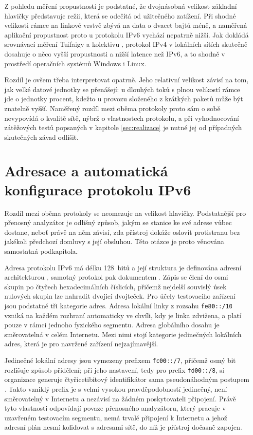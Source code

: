 Z pohledu měření propustnosti je podstatné, že dvojnásobná velikost základní hlavičky představuje režii, která se odečítá od užitečného zatížení. Při shodné velikosti rámce na linkové vrstvě zbývá na data o dvacet bajtů méně, a naměřená aplikační propustnost proto u protokolu IPv6 vychází nepatrně nižší. Jak dokládá srovnávací měření Tuifaigy a kolektivu \cite{tuifaiga2021}, protokol IPv4 v lokálních sítích skutečně dosahuje o něco vyšší propustnosti a nižší latence než IPv6, a to shodně v prostředí operačních systémů Windows i Linux.

Rozdíl je ovšem třeba interpretovat opatrně. Jeho relativní velikost závisí na tom, jak velké datové jednotky se přenášejí: u dlouhých toků s plnou velikostí rámce jde o jednotky procent, kdežto u provozu složeného z krátkých paketů může být znatelně vyšší. Naměřený rozdíl mezi oběma protokoly proto sám o sobě nevypovídá o kvalitě sítě, nýbrž o vlastnostech protokolu, a při vyhodnocování zátěžových testů popsaných v kapitole \ref{sec:realizace} je nutné jej od případných skutečných závad odlišit.

\section{Adresace a automatická konfigurace protokolu IPv6}
\label{sec:ipv6_adresace}

Rozdíl mezi oběma protokoly se neomezuje na velikost hlavičky. Podstatnější pro přenosný analyzátor je odlišný způsob, jakým se stanice ke své adrese vůbec dostane, neboť právě na něm závisí, zda přístroj dokáže oslovit protistranu bez jakékoli předchozí domluvy s její obsluhou. Této otázce je proto věnována samostatná podkapitola.

Adresa protokolu IPv6 má délku 128~bitů a její struktura je definována adresní architekturou \cite{rfc4291}, samotný protokol pak dokumentem \cite{rfc8200}. Zápis se člení do osmi skupin po čtyřech hexadecimálních číslicích, přičemž nejdelší souvislý úsek nulových skupin lze nahradit dvojicí dvojteček. Pro účely testovacího zařízení jsou podstatné tři kategorie adres. Adresa lokální linky z rozsahu \texttt{fe80::/10} vzniká na každém rozhraní automaticky ve chvíli, kdy je linka zdvižena, a platí pouze v rámci jednoho fyzického segmentu. Adresa globálního dosahu je směrovatelná v celém Internetu. Mezi nimi stojí kategorie jedinečných lokálních adres, která je pro navržené zařízení nejzajímavější.

Jedinečné lokální adresy jsou vymezeny prefixem \texttt{fc00::/7}, přičemž osmý bit rozlišuje způsob přidělení; při jeho nastavení, tedy pro prefix \texttt{fd00::/8}, si organizace generuje čtyřicetibitový identifikátor sama pseudonáhodným postupem \cite{rfc4193}. Takto vzniklý prefix je s velmi vysokou pravděpodobností jedinečný, není směrovatelný v Internetu a nezávisí na žádném poskytovateli připojení. Právě tyto vlastnosti odpovídají povaze přenosného analyzátoru, který pracuje v uzavřeném testovacím segmentu, nemá trvalé připojení k Internetu a jehož adresní plán nesmí kolidovat s adresami sítě, do níž je přístroj dočasně zapojen.

